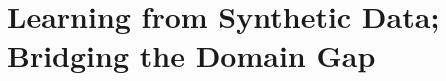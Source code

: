 

\chapter{Learning from Synthetic Data; Bridging the Domain Gap}\label{chap:cgas}

\def\figref#1{Fig.~\ref{fig:#1}}

\ifpdf
    \graphicspath{{Chapter4/Figs/Raster/}{Chapter4/Figs/PDF/}{Chapter4/Figs/}}
\else
    \graphicspath{{Chapter4/Figs/Vector/}{Chapter4/Figs/}}
\fi









